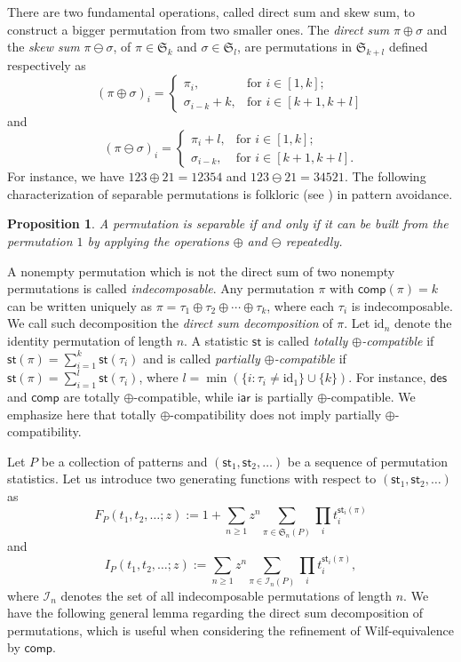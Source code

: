 \documentclass[12pt]{amsart}
\numberwithin{equation}{section}
\theoremstyle{plain}
\newtheorem{proposition}[theorem]{Proposition}
\theoremstyle{definition}
\def\des{\mathsf{des}}
\def\S{\mathfrak{S}}
\def\iar{\mathsf{iar}}
\def\comp{\mathsf{comp}}
\def\st{\mathsf{st}}
\newcommand{\In}{\mathcal{I}}
\def\id{\mathrm{id}}
\begin{document}
There are two fundamental operations, called direct sum and skew sum, to construct a bigger permutation from two smaller ones. 
The \emph{direct sum} $\pi\oplus\sigma$ and the \emph{skew sum} $\pi\ominus\sigma$, of $\pi\in\S_k$ and $\sigma\in\S_l$, are permutations in $\S_{k+l}$ defined respectively as
$$
(\pi\oplus\sigma)_i=
\begin{cases}
\pi_i, &\text{for $i\in[1,k]$};\\
\sigma_{i-k}+k, &\text{for $i\in[k+1,k+l]$}
\end{cases}
$$
and
$$
(\pi\ominus\sigma)_i=
\begin{cases}
\pi_i+l, &\text{for $i\in[1,k]$};\\
\sigma_{i-k}, &\text{for $i\in[k+1,k+l]$}.
\end{cases}
$$
 For instance, we have $123\oplus 21=12354$ and $123\ominus 21=34521$. 
 The following  characterization of separable permutations is  folkloric  (see \cite[pp.~57]{kit}) in pattern avoidance. 
 \begin{proposition}\label{desides}
 A permutation is separable if and only if it can be built from the permutation $1$ by applying the operations $\oplus$ and $\ominus$ repeatedly. 
 \end{proposition}
 
A nonempty permutation which is not the direct sum of two nonempty permutations is called {\em indecomposable}. Any permutation $\pi$ with $\comp(\pi)=k$ can be written uniquely as $\pi=\tau_1\oplus\tau_2\oplus\cdots\oplus\tau_k$, where each $\tau_i$ is indecomposable. We call such decomposition the {\em direct sum decomposition} of $\pi$.
Let $\id_n$ denote the identity permutation of length $n$. A statistic $\st$ is called  {\em totally  $\oplus$-compatible}  if  
$
\st(\pi)=\sum_{i=1}^k\st(\tau_i)
$
and is called {\em partially $\oplus$-compatible} if 
$
\st(\pi)=\sum_{i=1}^l\st(\tau_i)$,
where $l=\min(\{i:\tau_i\neq \id_1\}\cup\{k\})$. For instance, $\des$ and $\comp$ are totally  $\oplus$-compatible, while $\iar$ is partially $\oplus$-compatible. We emphasize here that totally $\oplus$-compatibility does not imply partially $\oplus$-compatibility. 


Let $P$ be a collection of patterns and  $(\st_1,\st_2,\ldots)$ be a sequence of permutation statistics. Let us introduce two generating functions with respect to $(\st_1,\st_2,\ldots)$ as
$$
F_P(t_1,t_2,\ldots;z):=1+\sum_{n\geq1}z^n\sum_{\pi\in\S_n(P)}\prod_it_i^{\st_i(\pi)}
$$
and 
$$
I_P(t_1,t_2,\ldots;z):=\sum_{n\geq1}z^n\sum_{\pi\in\In_n(P)}\prod_it_i^{\st_i(\pi)},
$$
where $\In_n$ denotes the set of all indecomposable permutations of length $n$. 
We have the following general lemma regarding the direct sum decomposition of permutations, which is useful when considering the refinement of Wilf-equivalence by $\comp$. 
\end{document}
